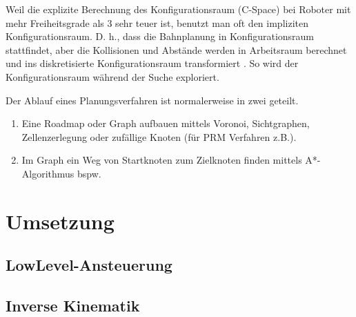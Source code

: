 Weil die explizite Berechnung des Konfigurationsraum (C-Space) bei Roboter mit mehr Freiheitsgrade als 3 sehr teuer ist, benutzt man oft den impliziten Konfigurationsraum. D. h., dass die Bahnplanung in Konfigurationsraum stattfindet, aber die Kollisionen und Abstände werden in Arbeitsraum berechnet und ins diskretisierte Konfigurationsraum transformiert \citep{innoKonz}. So wird der Konfigurationsraum während der Suche exploriert.

Der Ablauf eines Planungsverfahren ist normalerweise in zwei geteilt.
\begin{enumerate}
\item Eine Roadmap oder Graph aufbauen mittels Voronoi, Sichtgraphen, Zellenzerlegung oder zufällige Knoten (für PRM Verfahren z.B.).
\item Im Graph ein Weg von Startknoten zum Zielknoten finden mittels A*-Algorithmus bspw.
\end{enumerate}



\section{Umsetzung}
\label{bahnplanung_umsetzung_sec}


\subsection{LowLevel-Ansteuerung}
\label{bahnplanung_lowlevel_subsec}
\authorsection{\editoroier}




\subsection{Inverse Kinematik}
\label{inverse_kinematik_subsec}
\authorsection{\editorjulian}



